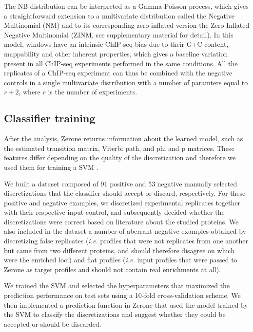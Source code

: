 \documentclass{bioinfo}
\begin{document}
\begin{methods}
The NB distribution can be interpreted as a Gamma-Poisson process,
which gives a straightforward extension to a multivariate
distribution called the Negative Multinomial (NM) and to its
corresponding zero-inflated version the Zero-Inflated Negative
Multinomial (ZINM, see supplementary material for detail). In this model,
windows have an intrinsic ChIP-seq bias due to their G+C content, 
mappability and other inherent properties, which gives a baseline
variation present in all ChIP-seq experiments performed in the same
conditions. All the replicates of a ChIP-seq experiment can thus be
combined with the negative controls in a single multivariate distribution
with a number of paramters equal to $r+2$, where $r$ is the number of
experiments.

\subsection{Classifier training}
After the analysis, Zerone returns information about the learned model, such as
the estimated transition matrix, Viterbi path, and phi and p matrices. These
features differ depending on the quality of the discretization and therefore we
used them for training a SVM \citep{e1071}.

We built a dataset composed of 91 positive and 53 negative manually selected
discretizations that the classifier should accept or discard, respectively.
For these positive and negative examples, we discretized experimental replicates
together with their respective input control, and subsequently decided whether
the discretizations were correct based on literature about the studied proteins.
We also included in the dataset a number of aberrant negative examples obtained
by discretizing false replicates (\emph{i.e.} profiles that were not replicates
from one another but came from two different proteins, and should therefore
disagree on which were the enriched loci) and flat profiles (\emph{i.e.} input
profiles that were passed to Zerone as target profiles and should not contain
real enrichments at all).

We trained the SVM and selected the hyperparameters that maximized the
prediction performance on test sets using a 10-fold cross-validation scheme. We
then implemented a prediction function in Zerone that used the model trained by
the SVM to classify the discretizations and suggest whether they could be
accepted or should be discarded.



\end{methods}
\end{document}
